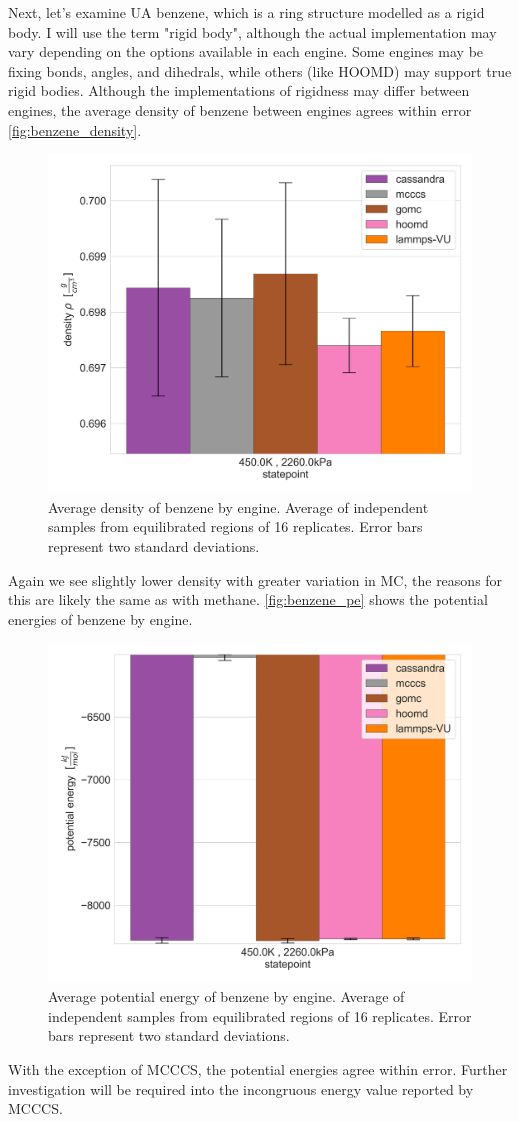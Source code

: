 Next, let's examine UA benzene, which is a ring structure modelled as a rigid body. 
I will use the term "rigid body", although the actual implementation may vary depending on the options available in each engine.
Some engines may be fixing bonds, angles, and dihedrals, while others (like HOOMD) may support true rigid bodies.
Although the implementations of rigidness may differ between engines, the average density of benzene between engines agrees within error \autoref{fig:benzene_density}.
\begin{figure}[h!]
    \centering
    \includegraphics[width=0.8\linewidth,keepaspectratio]{figures/rep_study/benzeneUA_summary.png}
    \caption{Average density of benzene by engine. Average of independent samples from equilibrated regions of 16 replicates. Error bars represent two standard deviations.}\label{fig:benzene_density}
\end{figure}
Again we see slightly lower density with greater variation in MC, the reasons for this are likely the same as with methane. %
\autoref{fig:benzene_pe} shows the potential energies of benzene by engine.
\begin{figure}[h!]
    \centering
    \includegraphics[width=0.8\linewidth,keepaspectratio]{figures/rep_study/benzeneUA_pe_summary.png}
    \caption{Average potential energy of benzene by engine. Average of independent samples from equilibrated regions of 16 replicates. Error bars represent two standard deviations.}\label{fig:benzene_pe}
\end{figure}
With the exception of MCCCS, the potential energies agree within error. 
Further investigation will be required into the incongruous energy value reported by MCCCS.

